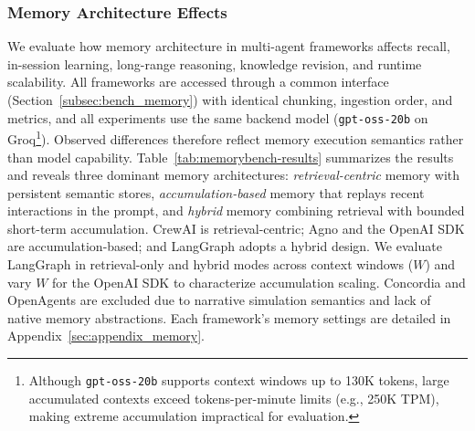 

\vspace{-2mm}
\subsubsection{Memory Architecture Effects}
\label{subsec:memoryagentbench}

We evaluate how memory architecture in multi-agent frameworks affects recall, in-session learning, long-range reasoning, knowledge revision, and runtime scalability. All frameworks are accessed through a common interface (Section~\ref{subsec:bench_memory}) with identical chunking, ingestion order, and metrics, and all experiments use the same backend model (\texttt{gpt-oss-20b} on Groq\footnote{Although \texttt{gpt-oss-20b} supports context windows up to 130K tokens, large accumulated contexts exceed tokens-per-minute limits (e.g., 250K TPM), making extreme accumulation impractical for evaluation.}). Observed differences therefore reflect memory execution semantics rather than model capability.
%
Table~\ref{tab:memorybench-results} summarizes the results and reveals three dominant memory architectures: \emph{retrieval-centric} memory with persistent semantic stores, \emph{accumulation-based} memory that replays recent interactions in the prompt, and \emph{hybrid} memory combining retrieval with bounded short-term accumulation. CrewAI is retrieval-centric; Agno and the OpenAI SDK are accumulation-based; and LangGraph adopts a hybrid design. We evaluate LangGraph in retrieval-only and hybrid modes across context windows ($W$) and vary $W$ for the OpenAI SDK to characterize accumulation scaling. Concordia and OpenAgents are excluded due to narrative simulation semantics and lack of native memory abstractions. Each framework’s memory settings are detailed in Appendix~\ref{sec:appendix_memory}.\shorten




